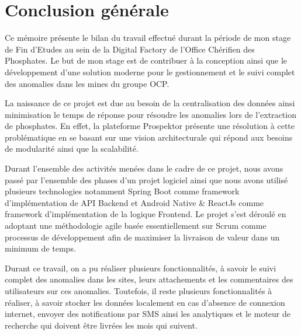 \chapter*{Conclusion g\'en\'erale}

Ce m\'emoire pr\'esente le bilan du travail effectu\'e durant la p\'eriode de mon stage de Fin d'Etudes au sein de la Digital Factory de l'Office Ch\'erifien des Phosphates. Le but de mon stage est de contribuer \`a la conception ainsi que le d\'eveloppement d'une solution moderne pour le gestionnement et le suivi complet des anomalies dans les mines du groupe \gls{OCP}.

La naissance de ce projet est due au besoin de la centralisation des donn\'ees ainsi minimisation le temps de r\'eponse pour r\'esoudre les anomalies lors de l'extraction de phosphates. En effet, la plateforme Prospektor pr\'esente une r\'esolution \`a cette probl\'ematique en se basant sur une vision architecturale qui r\'epond aux besoins de modularit\'e ainsi que la scalabilit\'e.

Durant l'ensemble des activit\'es men\'ees dans le cadre de ce projet, nous avons pass\'e par l'ensemble des phases d'un projet logiciel ainsi que nous avons utilis\'e plusieurs technologies notamment Spring Boot comme framework d'impl\'ementation de \gls{API} Backend et Android Native \& ReactJs comme framework d'impl\'ementation de la logique Frontend. Le projet s'est d\'eroul\'e en adoptant une m\'ethodologie agile bas\'ee essentiellement sur Scrum comme processus de d\'eveloppement afin de maximiser la livraison de valeur dans un minimum de temps.

Durant ce travail, on a pu r\'ealiser plusieurs fonctionnalit\'es, \`a savoir le suivi complet des anomalies dans les sites, leurs attachements et les commentaires des utilisateurs sur ces anomalies. Toutefois, il reste plusieurs fonctionnalit\'es \`a r\'ealiser, \`a savoir stocker les donn\'ees localement en cas d'absence de connexion internet, envoyer  des notifications par \gls{SMS} ainsi les analytiques et le moteur de recherche qui doivent \^etre livr\'ees les mois qui suivent.